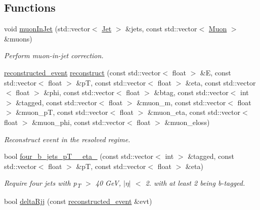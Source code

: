 \subsection*{Functions}
\begin{DoxyCompactItemize}
\item 
void \mbox{\hyperlink{resolved-recon_8cpp_ad3c5fdef0ce29848bc5a8940edac0b57}{muon\+In\+Jet}} (std\+::vector$<$ \mbox{\hyperlink{classJet}{Jet}} $>$ \&jets, const std\+::vector$<$ \mbox{\hyperlink{classMuon}{Muon}} $>$ \&muons)
\begin{DoxyCompactList}\small\item\em Perform muon-\/in-\/jet correction. \end{DoxyCompactList}\item 
\mbox{\label{resolved-recon_8cpp_a50608d81fc6fe778636a9a6187fcedb6}} 
\mbox{\hyperlink{structreconstructed__event}{reconstructed\+\_\+event}} \mbox{\hyperlink{resolved-recon_8cpp_a50608d81fc6fe778636a9a6187fcedb6}{reconstruct}} (const std\+::vector$<$ float $>$ \&E, const std\+::vector$<$ float $>$ \&pT, const std\+::vector$<$ float $>$ \&eta, const std\+::vector$<$ float $>$ \&phi, const std\+::vector$<$ float $>$ \&btag, const std\+::vector$<$ int $>$ \&tagged, const std\+::vector$<$ float $>$ \&muon\+\_\+m, const std\+::vector$<$ float $>$ \&muon\+\_\+pT, const std\+::vector$<$ float $>$ \&muon\+\_\+eta, const std\+::vector$<$ float $>$ \&muon\+\_\+phi, const std\+::vector$<$ float $>$ \&muon\+\_\+eloss)
\begin{DoxyCompactList}\small\item\em Reconstruct event in the resolved regime. \end{DoxyCompactList}\item 
bool \mbox{\hyperlink{resolved-recon_8cpp_a1006dab11d2d2a4a97a19cc9a1097e57}{four\+\_\+b\+\_\+jets\+\_\+p\+T\+\_\+\_\+eta\+\_}} (const std\+::vector$<$ int $>$ \&tagged, const std\+::vector$<$ float $>$ \&pT, const std\+::vector$<$ float $>$ \&eta)
\begin{DoxyCompactList}\small\item\em Require four jets with p\textsubscript{T} $>$ 40 GeV, $\vert${$\eta$}$\vert$ $<$ 2. with at least 2 being b-\/tagged. \end{DoxyCompactList}\item 
\mbox{\label{resolved-recon_8cpp_a01e94a57e88164690ac81eab7d4bbec4}} 
bool \mbox{\hyperlink{resolved-recon_8cpp_a01e94a57e88164690ac81eab7d4bbec4}{delta\+Rjj}} (const \mbox{\hyperlink{structreconstructed__event}{reconstructed\+\_\+event}} \&evt)

\end{DoxyCompactItemize}
